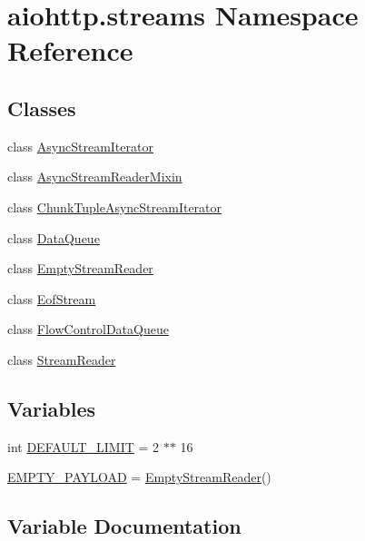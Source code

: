 \hypertarget{namespaceaiohttp_1_1streams}{}\section{aiohttp.\+streams Namespace Reference}
\label{namespaceaiohttp_1_1streams}
\subsection*{Classes}
\begin{DoxyCompactItemize}
\item 
class \hyperlink{classaiohttp_1_1streams_1_1_async_stream_iterator}{Async\+Stream\+Iterator}
\item 
class \hyperlink{classaiohttp_1_1streams_1_1_async_stream_reader_mixin}{Async\+Stream\+Reader\+Mixin}
\item 
class \hyperlink{classaiohttp_1_1streams_1_1_chunk_tuple_async_stream_iterator}{Chunk\+Tuple\+Async\+Stream\+Iterator}
\item 
class \hyperlink{classaiohttp_1_1streams_1_1_data_queue}{Data\+Queue}
\item 
class \hyperlink{classaiohttp_1_1streams_1_1_empty_stream_reader}{Empty\+Stream\+Reader}
\item 
class \hyperlink{classaiohttp_1_1streams_1_1_eof_stream}{Eof\+Stream}
\item 
class \hyperlink{classaiohttp_1_1streams_1_1_flow_control_data_queue}{Flow\+Control\+Data\+Queue}
\item 
class \hyperlink{classaiohttp_1_1streams_1_1_stream_reader}{Stream\+Reader}
\end{DoxyCompactItemize}
\subsection*{Variables}
\begin{DoxyCompactItemize}
\item 
int \hyperlink{namespaceaiohttp_1_1streams_aad55c118f5ff352b6399c9c2d4582d79}{D\+E\+F\+A\+U\+L\+T\+\_\+\+L\+I\+M\+IT} = 2 $\ast$$\ast$ 16
\item 
\hyperlink{namespaceaiohttp_1_1streams_a869cd54235885bcebe8511f4ec759069}{E\+M\+P\+T\+Y\+\_\+\+P\+A\+Y\+L\+O\+AD} = \hyperlink{classaiohttp_1_1streams_1_1_empty_stream_reader}{Empty\+Stream\+Reader}()
\end{DoxyCompactItemize}


\subsection{Variable Documentation}
\mbox{\label{namespaceaiohttp_1_1streams_aad55c118f5ff352b6399c9c2d4582d79}} 
